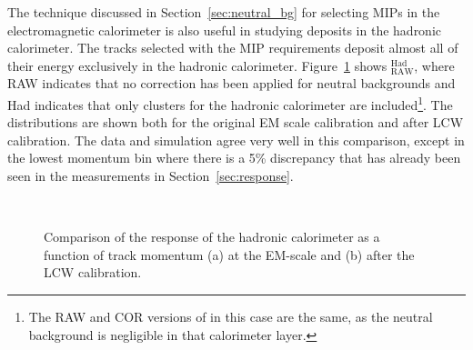 The technique discussed in Section~\ref{sec:neutral_bg} for selecting \ac{MIP}s in the electromagnetic calorimeter is also useful in studying deposits in the hadronic calorimeter.
The tracks selected with the \ac{MIP} requirements deposit almost all of their energy exclusively in the hadronic calorimeter.
Figure~\ref{fig:epav_hcal} shows \epav$_\mathrm{RAW}^\mathrm{Had}$, where RAW indicates that no correction has been applied for neutral backgrounds and Had indicates that only clusters for the hadronic calorimeter are included\footnote{The RAW and COR versions of \epav in this case are the same, as the neutral background is negligible in that calorimeter layer.}.
The distributions are shown both for the original EM scale calibration and after LCW calibration.
The data and simulation agree very well in this comparison, except in the lowest momentum bin where there is a 5\% discrepancy that has already been seen in the measurements in Section~\ref{sec:response}.

\begin{figure}[h]
\centering
{}
~
\caption{Comparison of the response of the hadronic calorimeter as a function of track momentum (a) at the EM-scale and (b) after the LCW calibration.}
\label{fig:epav_hcal}
\end{figure}

